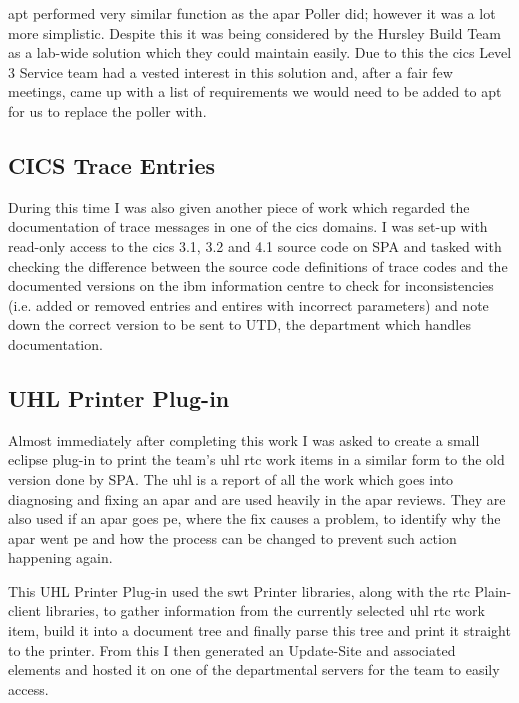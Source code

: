 \documentclass[a4paper,11pt]{report}
\begin{document}
\gls{apt} performed very similar function as the \gls{apar} Poller did; however it was a lot more
simplistic. Despite this it was being considered by the Hursley Build Team as a lab-wide solution
which they could maintain easily. Due to this the \gls{cics} Level 3 Service team had a vested
interest in this solution and, after a fair few meetings, came up with a list of requirements we
would need to be added to \gls{apt} for us to replace the poller with. \\


\subsection{CICS Trace Entries}

During this time I was also given another piece of work which regarded the documentation of trace
messages in one of the \gls{cics} domains. I was set-up with read-only access to the \gls{cics} 
3.1, 3.2 and 4.1 source code on SPA and tasked with checking the difference between the source code
definitions of trace codes and the documented versions on the \gls{ibm} information centre to check
for inconsistencies (i.e. added or removed entries and entires with incorrect parameters) and note
down the correct version to be sent to UTD, the department which handles documentation. \\

\subsection{UHL Printer Plug-in}

Almost immediately after completing this work I was asked to create a small eclipse plug-in to print
the team's \gls{uhl} \gls{rtc} work items in a similar form to the old version done by SPA. The 
\gls{uhl} is a report of all the work which goes into diagnosing and fixing an \gls{apar} and are
used heavily in the \gls{apar} reviews. They are also used if an \gls{apar} goes \gls{pe}, where
the fix causes a problem, to identify why the \gls{apar} went \gls{pe} and how the process can be
changed to prevent such action happening again.

This UHL Printer Plug-in used the \gls{swt} Printer libraries, along with the \gls{rtc} 
Plain-client libraries, to gather information from the currently selected \gls{uhl} \gls{rtc} work
item, build it into a document tree and finally parse this tree and print it straight to the 
printer. From this I then generated an Update-Site and associated elements and hosted it on one of
the departmental servers for the team to easily access. \\
\end{document}
